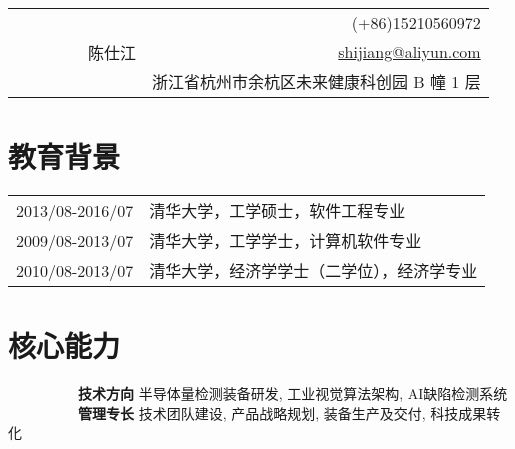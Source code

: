 \documentclass[a4paper,10pt]{professional-cv-cn}
\begin{document}
\pagestyle{empty}

\begin{tabular}{@{} l r @{}}
    \multirow{3}{19.5em}{\Huge ~~~~~~~~~陈仕江}
        & (+86)15210560972 \\
        & \href{mailto:shijiang@aliyun.com}{shijiang@aliyun.com} \\
        & 浙江省杭州市余杭区未来健康科创园 B 幢 1 层
\end{tabular}

\section{教育背景}
\begin{tabular}{r l}
    \textsc{2013/08-2016/07}
        & 清华大学，工学硕士，软件工程专业
    \\
    \textsc{2009/08-2013/07}
        & 清华大学，工学学士，计算机软件专业
    \\
    \textsc{2010/08-2013/07}
        & 清华大学，经济学学士（二学位），经济学专业
\end{tabular}

\section{核心能力}
\begin{entrylist}
    \internentry
        {~~~~~~~~~~\textbf{技术方向}}
        {}
        {}
        {
            \textsc{半导体量检测装备研发},
            \textsc{工业视觉算法架构},
            \textsc{AI缺陷检测系统}
        }
    \internentry
        {~~~~~~~~~~\textbf{管理专长}}
        {}
        {}
        {
            \textsc{技术团队建设},
            \textsc{产品战略规划},
            \textsc{装备生产及交付},
            \textsc{科技成果转化}
        }
\end{entrylist}

\end{document}
